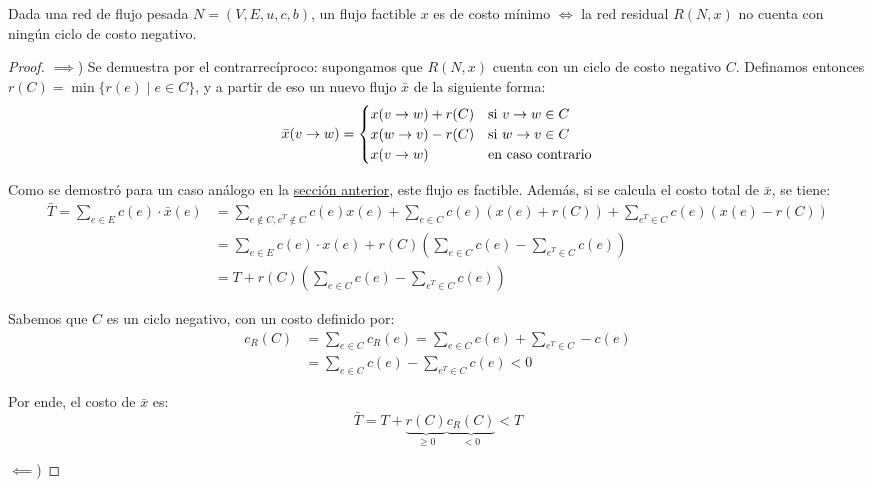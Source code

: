 \begin{theorem*}
    Dada una red de flujo pesada $N = (V, E, u, c, b)$, un flujo factible $x$ es de costo mínimo $\iff$ la red residual $R(N, x)$ no cuenta con ningún ciclo de costo negativo.
\end{theorem*}
\begin{proof}
    \leavevmode

    $\implies$) Se demuestra por el contrarrecíproco: supongamos que $R(N, x)$ cuenta con un ciclo de costo negativo $C$. Definamos entonces $r(C) = \min{\{r(e) \mid e \in C\}}$, y a partir de eso un nuevo flujo $\bar{x}$ de la siguiente forma:
    $$
        \bar{x}(v \rightarrow w) =
        \begin{cases}
            x(v \rightarrow w) + r(C) & \text{si } v \rightarrow w \in C \\
            x(w \rightarrow v) - r(C) & \text{si } w \rightarrow v \in C \\
            x(v \rightarrow w)        & \text{en caso contrario}
        \end{cases}
    $$

    Como se demostró para un caso análogo en la \hyperref[teorema-camino-aumento]{sección anterior}, este flujo es factible. Además, si se calcula el costo total de $\bar{x}$, se tiene:
    \begin{align*}
        \bar{T} = \sum_{e \in E} c(e) \cdot \bar{x}(e) & = \sum_{e \notin C, e^T \notin C} c(e) x(e) + \sum_{e \in C} c(e) (x(e) + r(C)) + \sum_{e^T \in C} c(e) (x(e) - r(C)) \\
                                                       & = \sum_{e \in E} c(e) \cdot x(e) + r(C) \left(\sum_{e \in C} c(e) - \sum_{e^T \in C} c(e)\right)                      \\
                                                       & = T + r(C) \left(\sum_{e \in C} c(e) - \sum_{e^T \in C} c(e)\right)
    \end{align*}

    Sabemos que $C$ es un ciclo negativo, con un costo definido por:
    \begin{align*}
        c_R(C) & = \sum_{e \in C} c_R(e) = \sum_{e \in C} c(e) + \sum_{e^T \in C} -c(e) \\
               & = \sum_{e \in C} c(e) - \sum_{e^T \in C} c(e) < 0
    \end{align*}

    Por ende, el costo de $\bar{x}$ es:
    $$\bar{T} = T + \underbrace{r(C)}_{\geq 0} \underbrace{c_R(C)}_{< 0} < T$$

    $\impliedby$) %

\end{proof}


